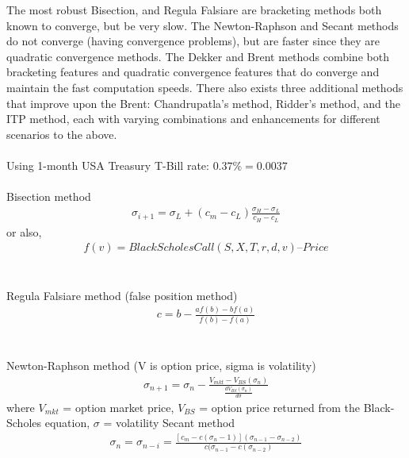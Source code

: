 \documentclass{article}
\begin{document}
The most robust Bisection, and Regula Falsiare are bracketing methods both known to converge, but be very slow. 
\cite{bisectionWiki}
\cite{opengenus}
The Newton-Raphson and Secant methods do not converge (having convergence problems), but are faster since they are quadratic convergence methods. 
\cite{bisectionMethod}
The Dekker and Brent methods combine both bracketing features and quadratic convergence features that do converge and maintain the fast computation speeds.
\cite{medium}
There also exists three additional methods that improve upon the Brent: Chandrupatla's method, Ridder's method, and the ITP method, each with varying combinations and enhancements for different scenarios to the above.
\cite{brent}
\\\\
Using 1-month USA Treasury T-Bill rate: $0.37\% = 0.0037$
\\\\
Bisection method
\begin{equation}
\begin{split}
\sigma_{i+1} = \sigma_L + (c_m - c_L)\frac{\sigma_H - \sigma_L}{c_H - c_L}
\end{split}
\end{equation}
or also, 
\begin{equation}
\begin{split}
f(v) = BlackScholesCall(S, X, T, r, d, v) – Price
\end{split}
\end{equation}
\\\\
Regula Falsiare method (false position method)
\begin{equation}
\begin{split}
c = b - \frac{af(b)-bf(a)}{f(b)-f(a)}
\end{split}
\end{equation}
\\\\
Newton-Raphson method (V is option price, sigma is volatility)
\begin{equation}
\begin{split}
\sigma_{n+1} = \sigma_n - \frac{V_{mkt} - V_{BS} (\sigma_n)}{\frac{dV_{BS}(\sigma_n)}{d\sigma}}
\end{split}
\end{equation}
where $V_{mkt}$ = option market price, 
$V_{BS}$ = option price returned from the Black-Scholes equation,
$\sigma$ = volatility
Secant method
\begin{equation}
\begin{split}
\sigma_n = \sigma_{n-i} = \frac{[c_m - c(\sigma_n - 1)](\sigma_{n-1} - \sigma_{n-2})}{c(\sigma_{n-1} - c(\sigma_{n-2})}
\end{split}
\end{equation}
\end{document}
